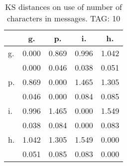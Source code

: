 \begin{table}[h!]
\begin{center}
\begin{tabular}{| l | c | c | c | c |}\hline
 & g. & p. & i. & h. \\\hline
g. & 0.000  & 0.869  & 0.996  & 1.042 \\\hline
 & 0.000  & 0.046  & 0.038  & 0.051 \\\hline
p. & 0.869  & 0.000  & 1.465  & 1.305 \\\hline
 & 0.046  & 0.000  & 0.084  & 0.085 \\\hline
i. & 0.996  & 1.465  & 0.000  & 1.549 \\\hline
 & 0.038  & 0.084  & 0.000  & 0.083 \\\hline
h. & 1.042  & 1.305  & 1.549  & 0.000 \\\hline
 & 0.051  & 0.085  & 0.083  & 0.000 \\\hline
\end{tabular}
\caption{KS distances on use of number of characters in messages. TAG: 10}
\end{center}
\end{table}